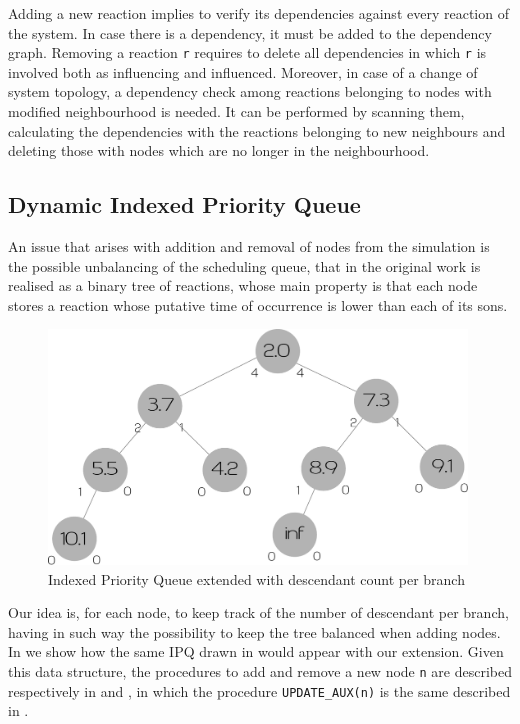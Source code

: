 \documentclass[12pt,a4paper,twoside,openright]{book}
\begin{document}
Adding a new reaction implies to verify its dependencies against every reaction of the system. In case there is a dependency, it must be added to the dependency graph. 
Removing a reaction \texttt{r} requires to delete all dependencies in which \texttt{r} is involved both as influencing and influenced.
Moreover, in case of a change of system topology, a dependency check among reactions belonging to nodes with modified neighbourhood is needed. It can be performed by scanning them, calculating the dependencies with the reactions belonging to new neighbours and deleting those with nodes which are no longer in the neighbourhood.

\subsection{Dynamic Indexed Priority Queue}

An issue that arises with addition and removal of nodes from the simulation is the possible unbalancing of the scheduling queue, that in the original work is realised as a binary tree of reactions, whose main property is that each node stores a reaction whose putative time of occurrence is lower than each of its sons.

\begin{figure}%
  \begin{center}
    \includegraphics[width=0.99\textwidth]{img/extipq.pdf}
    \caption{Indexed Priority Queue extended with descendant count per branch}
    \label{img:ipq}
  \end{center}
\end{figure}

Our idea is, for each node, to keep track of the number of descendant per branch, having in such way the possibility to keep the tree balanced when adding nodes. In  we show how the same IPQ drawn in \cite{gibson2000} would appear with our extension. Given this data structure, the procedures to add and remove a new node \texttt{n} are described respectively in  and , in which the procedure \texttt{UPDATE\_AUX(n)} is the same described in \cite{gibson2000}.
\end{document}
